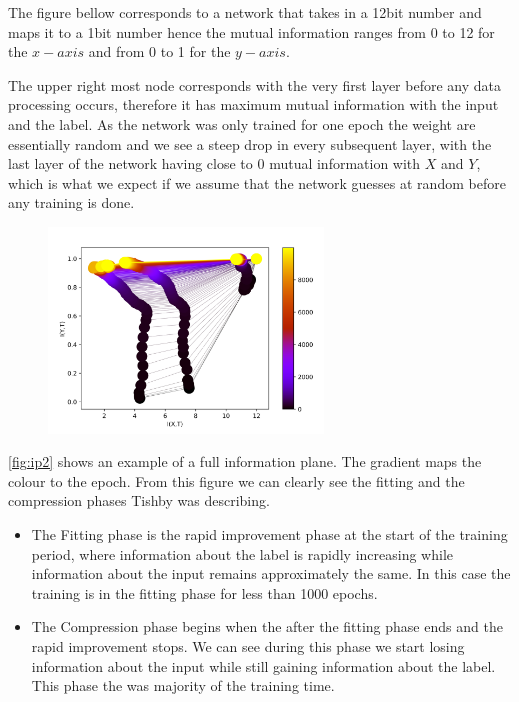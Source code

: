 The figure bellow corresponds to a network that takes in a 12bit number and maps
it to a 1bit number hence the mutual information ranges from 0 to 12 for the $
x-axis $ and from 0 to 1 for the $ y-axis $.

The upper right most node corresponds with the very first layer before any data
processing occurs, therefore it has maximum mutual information with the input
and the label. As the network was only trained for one epoch the weight are
essentially random and we see a steep drop in every subsequent layer, with the
last layer of the network having close to 0 mutual information with $ X $ and $
Y $, which is what we expect if we assume that the network guesses at random
before any training is done.

\begin{figure}[H]
  \centering
  \includegraphics[width=0.65\textwidth]{figs/ip_10000.png}
  \label{fig:ip2}
\end{figure}

\autoref{fig:ip2} shows an example of a full information plane. The gradient
maps the colour to the epoch. From this figure we can clearly see the fitting
and the compression phases Tishby was describing. 

\begin{itemize}
  \item{
      The Fitting phase is the rapid improvement phase at the start of the
      training period, where information about the label is rapidly increasing
      while information about the input remains approximately the same. In this
      case the training is in the fitting phase for less than 1000 epochs.
    }
  \item{
      The Compression phase begins when the after the fitting phase ends and the
      rapid improvement stops. We can see during this phase we start losing
      information about the input while still gaining information about the
      label. This phase the was majority of the training time.
    }
\end{itemize}
